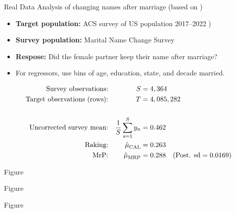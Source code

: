 \begin{frame}{Real Data}
Analysis of changing names after marriage (based on \citet{alexander:2019:namechange})

\begin{itemize}
    \item \textbf{Target population:} ACS survey of US population 2017--2022 \citep{ipumsusa})
    \item \textbf{Survey population:} Marital Name Change Survey \citep{cohen:2019:namechange}
    \item \textbf{Respose:}  Did the female partner keep their name after marriage?
    \item For regressors, use bins of age, education, state, and decade married.
\end{itemize}

$$
\begin{aligned}
    \textrm{Survey observations:} &&  S ={}& 4,364  \\
    \textrm{Target observations (rows):} &&  T ={}& 4,085,282 \\
    \\
    \textrm{Uncorrected survey mean:} && \frac{1}{S} \sum_{s=1}^S y_n ={}& 0.462 \\
    \textrm{Raking:} && \hat{\mu}^{}_{\mathrm{CAL}} ={}& 0.263 \\
    \textrm{MrP:} && \hat{\mu}^{}_{\mathrm{MRP}} ={}& 0.288
        \quad(\textrm{Post. sd} = 0.0169)\\
\end{aligned}
$$
%
\end{frame}


\begin{frame}{Figure}
\AlexanderImbalancePrimary{}
\end{frame}


\begin{frame}{Figure}
\AlexanderImbalanceInteraction{}
\end{frame}


\begin{frame}{Figure}
\AlexanderBandFig{}
\end{frame}